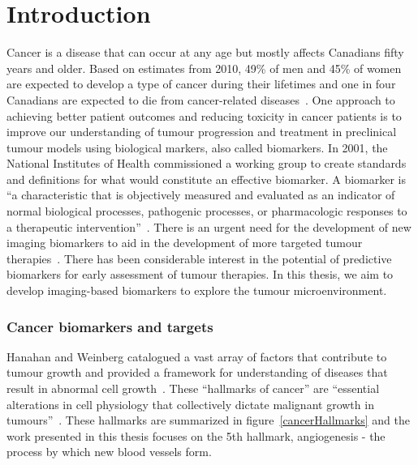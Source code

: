 
\chapter{Introduction}
\label{ch:Introduction}

Cancer is a disease that can occur at any age but mostly affects Canadians fifty years and older.
Based on estimates from 2010, 49\% of men and 45\% of women are expected to develop a type of cancer during their lifetimes and one in four Canadians are expected to die from cancer-related diseases~\cite{CancerSociety:2018tv}.
One approach to achieving better patient outcomes and reducing toxicity in cancer patients is to improve our understanding of tumour progression and treatment in preclinical tumour models using biological markers, also called biomarkers.
In 2001, the National Institutes of Health commissioned a working group to create standards and definitions for what would constitute an effective biomarker. 
A biomarker is ``a characteristic that is objectively measured and evaluated as an indicator of normal biological processes, pathogenic processes, or pharmacologic responses to a therapeutic intervention''~\cite{BiomarkersDefinitionsWorkingGroup:2001gd}.  
There is an urgent need for the development of new imaging biomarkers to aid in the development of more targeted tumour therapies~\cite{vanderMeel:2010cb}.
There has been considerable interest in the potential of predictive biomarkers for early assessment of tumour therapies. 
In this thesis, we aim to develop imaging-based biomarkers to explore the tumour microenvironment.

\subsection{Cancer biomarkers and targets} 

Hanahan and Weinberg catalogued a vast array of factors that contribute to tumour growth and provided a framework for understanding of diseases that result in abnormal cell growth~\cite{Hanahan:2000wo,Hanahan:2011gu}.
These ``hallmarks of cancer'' are ``essential alterations in cell physiology that collectively dictate malignant growth in tumours''~\cite{Hanahan:2000wo}.
These hallmarks are summarized in figure~\ref{cancerHallmarks} and the  work presented in this thesis focuses on the 5th hallmark, angiogenesis - the process by which new blood vessels form.

